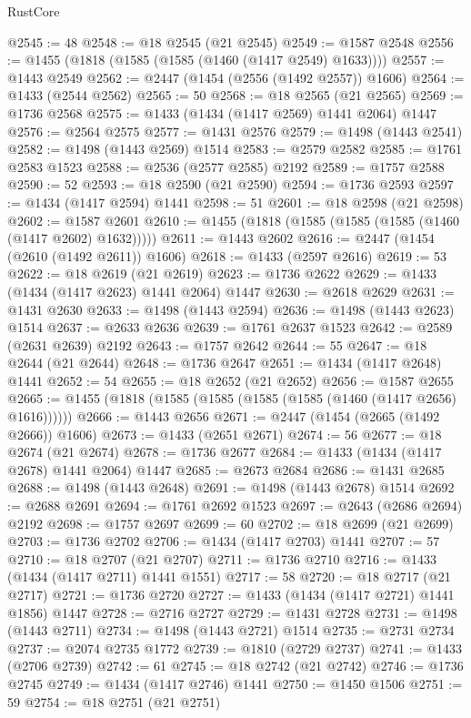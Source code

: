 \begin{lexlean}{RustCore}
\begin{coremodule}
@2545 := 48
@2548 := @18 @2545 (@21 @2545)
@2549 := @1587 @2548
@2556 := @1455 (@1818 (@1585 (@1585 (@1460 (@1417 @2549) @1633))))
@2557 := @1443 @2549
@2562 := @2447 (@1454 (@2556 (@1492 @2557)) @1606)
@2564 := @1433 (@2544 @2562)
@2565 := 50
@2568 := @18 @2565 (@21 @2565)
@2569 := @1736 @2568
@2575 := @1433 (@1434 (@1417 @2569) @1441 @2064) @1447
@2576 := @2564 @2575
@2577 := @1431 @2576
@2579 := @1498 (@1443 @2541)
@2582 := @1498 (@1443 @2569) @1514
@2583 := @2579 @2582
@2585 := @1761 @2583 @1523
@2588 := @2536 (@2577 @2585) @2192
@2589 := @1757 @2588
@2590 := 52
@2593 := @18 @2590 (@21 @2590)
@2594 := @1736 @2593
@2597 := @1434 (@1417 @2594) @1441
@2598 := 51
@2601 := @18 @2598 (@21 @2598)
@2602 := @1587 @2601
@2610 := @1455 (@1818 (@1585 (@1585 (@1585 (@1460 (@1417 @2602) @1632)))))
@2611 := @1443 @2602
@2616 := @2447 (@1454 (@2610 (@1492 @2611)) @1606)
@2618 := @1433 (@2597 @2616)
@2619 := 53
@2622 := @18 @2619 (@21 @2619)
@2623 := @1736 @2622
@2629 := @1433 (@1434 (@1417 @2623) @1441 @2064) @1447
@2630 := @2618 @2629
@2631 := @1431 @2630
@2633 := @1498 (@1443 @2594)
@2636 := @1498 (@1443 @2623) @1514
@2637 := @2633 @2636
@2639 := @1761 @2637 @1523
@2642 := @2589 (@2631 @2639) @2192
@2643 := @1757 @2642
@2644 := 55
@2647 := @18 @2644 (@21 @2644)
@2648 := @1736 @2647
@2651 := @1434 (@1417 @2648) @1441
@2652 := 54
@2655 := @18 @2652 (@21 @2652)
@2656 := @1587 @2655
@2665 := @1455 (@1818 (@1585 (@1585 (@1585 (@1585 (@1460 (@1417 @2656) @1616))))))
@2666 := @1443 @2656
@2671 := @2447 (@1454 (@2665 (@1492 @2666)) @1606)
@2673 := @1433 (@2651 @2671)
@2674 := 56
@2677 := @18 @2674 (@21 @2674)
@2678 := @1736 @2677
@2684 := @1433 (@1434 (@1417 @2678) @1441 @2064) @1447
@2685 := @2673 @2684
@2686 := @1431 @2685
@2688 := @1498 (@1443 @2648)
@2691 := @1498 (@1443 @2678) @1514
@2692 := @2688 @2691
@2694 := @1761 @2692 @1523
@2697 := @2643 (@2686 @2694) @2192
@2698 := @1757 @2697
@2699 := 60
@2702 := @18 @2699 (@21 @2699)
@2703 := @1736 @2702
@2706 := @1434 (@1417 @2703) @1441
@2707 := 57
@2710 := @18 @2707 (@21 @2707)
@2711 := @1736 @2710
@2716 := @1433 (@1434 (@1417 @2711) @1441 @1551)
@2717 := 58
@2720 := @18 @2717 (@21 @2717)
@2721 := @1736 @2720
@2727 := @1433 (@1434 (@1417 @2721) @1441 @1856) @1447
@2728 := @2716 @2727
@2729 := @1431 @2728
@2731 := @1498 (@1443 @2711)
@2734 := @1498 (@1443 @2721) @1514
@2735 := @2731 @2734
@2737 := @2074 @2735 @1772
@2739 := @1810 (@2729 @2737)
@2741 := @1433 (@2706 @2739)
@2742 := 61
@2745 := @18 @2742 (@21 @2742)
@2746 := @1736 @2745
@2749 := @1434 (@1417 @2746) @1441
@2750 := @1450 @1506
@2751 := 59
@2754 := @18 @2751 (@21 @2751)

\end{coremodule}
\end{lexlean}
